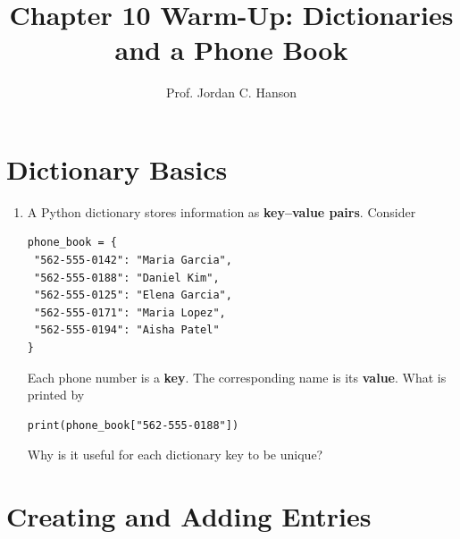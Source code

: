 \documentclass{article}
\begin{document}
\twocolumn

\title{Chapter 10 Warm-Up: Dictionaries and a Phone Book}
\author{Prof. Jordan C. Hanson}
\date{}

\maketitle

\section{Dictionary Basics}

\begin{enumerate}

\item A Python dictionary stores information as \textbf{key--value pairs}. Consider

\begin{verbatim}
phone_book = {
 "562-555-0142": "Maria Garcia",
 "562-555-0188": "Daniel Kim",
 "562-555-0125": "Elena Garcia",
 "562-555-0171": "Maria Lopez",
 "562-555-0194": "Aisha Patel"
}
\end{verbatim}

Each phone number is a \textbf{key}.  The corresponding name is its \textbf{value}.  What is printed by

\begin{verbatim}
print(phone_book["562-555-0188"])
\end{verbatim}

\vspace{0.1cm}

Why is it useful for each dictionary key to be unique?

\end{enumerate}


\section{Creating and Adding Entries}
\end{document}
